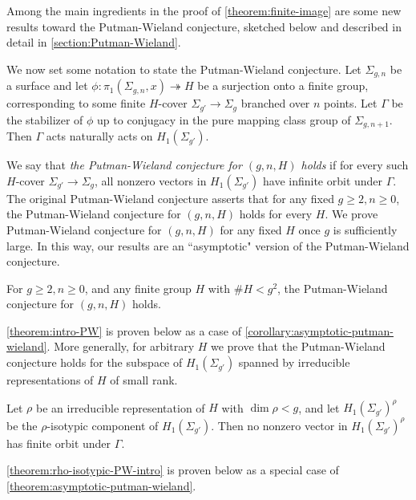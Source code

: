 Among the main ingredients in the proof of \autoref{theorem:finite-image} are some new results toward the Putman-Wieland conjecture, sketched below and
described in detail in \autoref{section:Putman-Wieland}.

We now set some notation to state the Putman-Wieland conjecture.
Let $\Sigma_{g,n}$ be a surface and let $\phi: \pi_1(\Sigma_{g,n},
x)\twoheadrightarrow H$ be a surjection onto a finite group, corresponding to
some finite $H$-cover $\Sigma_{g'}\to \Sigma_{g}$ branched over $n$ points. Let $\Gamma$ be the  stabilizer of $\phi$ up to conjugacy in the pure mapping class group of $\Sigma_{g,n+1}$. Then $\Gamma$ acts naturally acts on $H_1(\Sigma_{g'})$.

We say that {\em the Putman-Wieland conjecture for $(g,n,H)$ holds} if
for every such $H$-cover $\Sigma_{g'} \to \Sigma_g$,
all nonzero vectors in $H_1(\Sigma_{g'})$ have infinite orbit under $\Gamma$.
The original Putman-Wieland conjecture
\cite[Conjecture 1.2]{putmanW:abelian-quotients}
asserts that for any fixed $g \geq 2, n \geq 0$,
the Putman-Wieland conjecture for $(g,n,H)$
holds for every $H$.
We prove
Putman-Wieland conjecture for $(g,n,H)$ for any fixed $H$ once $g$
is sufficiently large.
In this way, our results are an ``asymptotic" version of the Putman-Wieland conjecture.
\begin{theorem}
\notready\label{theorem:intro-PW}
	For $g \geq 2, n \geq 0$, and any finite group $H$ with
	$\#H<g^2$,
	the Putman-Wieland conjecture for $(g,n,H)$ holds.
\end{theorem}
\autoref{theorem:intro-PW} is proven below as a case of \autoref{corollary:asymptotic-putman-wieland}.
More generally, for arbitrary $H$ we prove that the Putman-Wieland conjecture holds for the subspace of $H_1(\Sigma_{g'})$ spanned by irreducible representations of $H$ of small rank.
\begin{theorem}
\notready\label{theorem:rho-isotypic-PW-intro}
	Let $\rho$ be an irreducible representation of $H$ with $\dim\rho<g$, and let $H_1(\Sigma_{g'})^{\rho}$ be the $\rho$-isotypic component of $H_1(\Sigma_{g'})$. Then no nonzero vector in $H_1(\Sigma_{g'})^{\rho}$ has finite orbit under $\Gamma$.
\end{theorem}
\autoref{theorem:rho-isotypic-PW-intro} is proven below as a special case of
\autoref{theorem:asymptotic-putman-wieland}.

